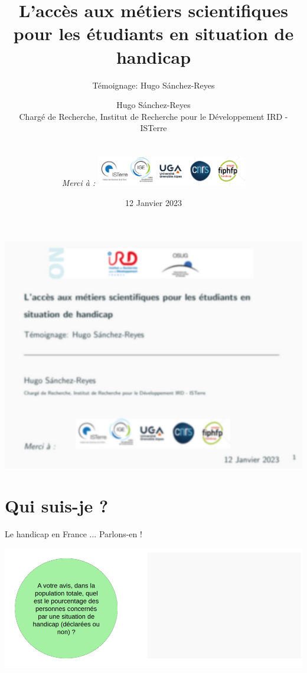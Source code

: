 \documentclass{beamer}
\title{{\normalsize \vskip 2cm 
L'accès aux
métiers scientifiques pour les
étudiants en situation de handicap}}
\subtitle{\small T\'emoignage: Hugo S\'anchez-Reyes}
\author{Hugo S\'anchez-Reyes \\ {\tiny Charg\'e de Recherche, Institut de Recherche pour le Développement IRD - ISTerre} \\ 
\\
\\
\textit{Merci à : \hspace{15pt}
\includegraphics[height=1.3cm]{../../logos/IRD-OSUG-ALL.png}\\}
}
\date[2021]{\vskip -0.5cm \hfill 12 Janvier 2023}
\begin{document}

\begin{frame}
 \includegraphics[width=1.2\linewidth]{images/1st_slide_blur.png} 
\end{frame}


\begin{frame}
    \titlepage
\end{frame}


\section{Qui suis-je ?  }

\begin{frame}
 {Le handicap en France ... Parlons-en ! } 
 
 \includegraphics[width=1\linewidth]{images/handicap_cake0.png} 
 
\end{frame}
\end{document}

